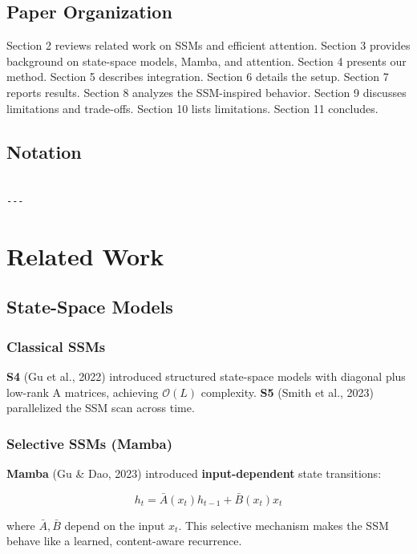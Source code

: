 \subsection{Paper Organization}

Section 2 reviews related work on SSMs and efficient attention. Section 3 
provides background on state-space models, Mamba, and attention. Section 4 
presents our method. Section 5 describes integration. Section 6 details the 
setup. Section 7 reports results. Section 8 analyzes the SSM-inspired 
behavior. Section 9 discusses limitations and trade-offs. Section 10 lists 
limitations. Section 11 concludes.



\subsection{Notation}

\begin{lstlisting}

---
\end{lstlisting}

\section{Related Work}

\subsection{State-Space Models}

\subsubsection{Classical SSMs}

\textbf{S4} (Gu et al., 2022) introduced structured state-space models with 
diagonal plus low-rank A matrices, achieving $\mathcal{O}(L)$ complexity. 
\textbf{S5} (Smith et al., 2023) parallelized the SSM scan across time.

\subsubsection{Selective SSMs (Mamba)}

\textbf{Mamba} (Gu \& Dao, 2023) introduced \textbf{input-dependent} state transitions:

\[
h_t = \bar{A}(x_t) h_{t-1} + \bar{B}(x_t) x_t
\tag{2.1}
\]

where $\bar{A}, \bar{B}$ depend on the input $x_t$. This selective mechanism 
makes the SSM behave like a learned, content-aware recurrence.

